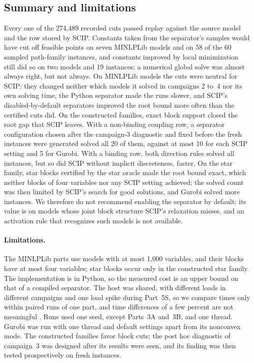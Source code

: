 \subsection{Summary and limitations}\label{sec:comp-summary}

Every one of the 274{,}489 recorded cuts passed replay against the source
model and the row stored by SCIP. Constants taken from the separator's samples
would have cut off feasible points on seven MINLPLib models and on 58 of the 60
sampled path-family instances, and constants improved by local minimization
still did so on two models and 19 instances; a numerical global solve was
almost always right, but not always. On MINLPLib models the cuts were neutral
for SCIP: they changed neither which models it solved in campaigns 2 to~4 nor
its own solving time, the Python separator made the runs slower, and SCIP's
disabled-by-default separators improved the root bound more often than the
certified cuts did. On the constructed families, exact block support closed
the root gap that SCIP leaves. With a non-binding coupling row, a separator
configuration chosen after the campaign-3 diagnostic and fixed before the fresh
instances were generated solved all 20 of them, against at most 10 for each
SCIP setting and 5 for Gurobi. With a binding row, both direction rules solved
all instances, but so did SCIP without implicit discreteness, faster. On the
star family, star blocks certified by the star oracle made the root bound
exact, which neither blocks of four variables nor any SCIP setting achieved;
the solved count was then limited by SCIP's search for good solutions, and
Gurobi solved more instances. We therefore do not recommend enabling the
separator by default; its value is on models whose joint block structure
SCIP's relaxation misses, and an activation rule that recognizes such models
is not available.

\paragraph{Limitations.} The MINLPLib parts use models with at most 1{,}000
variables, and their blocks have at most four variables; star blocks occur only
in the constructed star family. The implementation is in Python, so the
measured cost is an upper bound on that of a compiled separator. The host was
shared, with different loads in different campaigns and one load spike during
Part~5S, so we compare times only within paired runs of one part, and time
differences of a few percent are not meaningful \citep{LodiTramontani2013}.
Runs used one seed, except Parts~3A and~3B, and one thread. Gurobi was run with
one thread and default settings apart from its nonconvex mode. The constructed
families favor block cuts; the post hoc diagnostic of campaign~3 was designed
after its results were seen, and its finding was then tested prospectively on
fresh instances.
